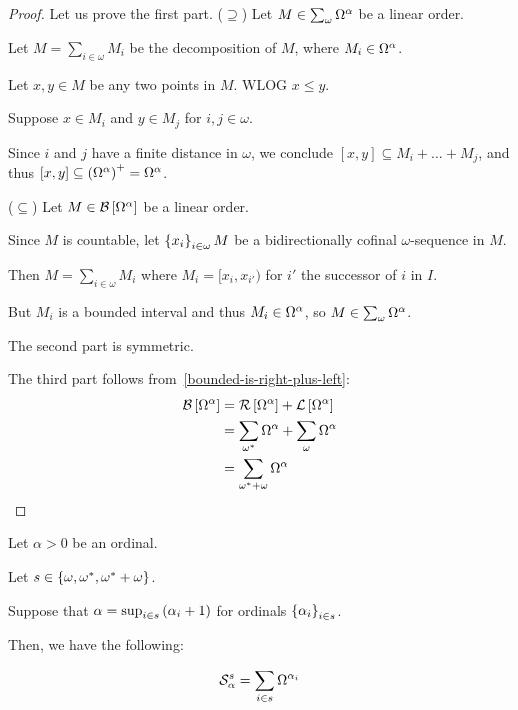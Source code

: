 \begin{proof}
  Let us prove the first part.
  ($\supseteq$) Let $M \in \sum_{\omega}{\Omega^{\alpha}}$ be a linear order.

  Let $M = \sum_{i \in \omega} M_i$ be the decomposition of $M$,
  where $M_i \in \Omega^{\alpha}$.

  Let $x, y \in M$ be any two points in $M$. WLOG $x \le y$.

  Suppose $x \in M_i$ and $y \in M_j$ for $i, j \in \omega$.

  Since $i$ and $j$ have a finite distance in $\omega$,
  we conclude $[x, y] \subseteq M_i + \ldots + M_j$,
  and thus $[x, y] \subseteq \left( {\Omega^{\alpha}} \right)^+ = \Omega^{{\alpha}}$.

  ($\subseteq$) Let $M \in \mathcal{B} \left[ {{\Omega^{\alpha}}} \right]$ be a linear order.

  Since $M$ is countable, let $\left\{ {x_i} \right\}_{i \in \omega} M$ be a bidirectionally cofinal
  $\omega$-sequence in $M$.

  Then $M = \sum_{i \in \omega} M_i$ where $M_i = [x_i, x_{i'})$ for $i'$
  the successor of $i$ in $I$.

  But $M_i$ is a bounded interval and thus $M_i \in \Omega^{\alpha}$, so $M \in \sum_{\omega}{\Omega^{\alpha}}$.

  The second part is symmetric.

  The third part follows from~\cref{bounded-is-right-plus-left}:
  \[
    \begin{aligned}
      \mathcal{B} \left[ {{\Omega^{\alpha}}} \right]
       & = \mathcal{R} \left[ {{\Omega^{\alpha}}} \right] + \mathcal{L} \left[ {{\Omega^{\alpha}}} \right]                     \\
       & = \sum_{\omega^\ast}{\Omega^{\alpha}} + \sum_{\omega}{\Omega^{\alpha}} \\
       & = \sum_{\omega^\ast + \omega}{\Omega^{\alpha}}
    \end{aligned}
  \]
\end{proof}

\begin{lemma}\label{b_alpha-structure-lemma}
  Let $\alpha > 0$ be an ordinal.

  Let $s \in \left\{ {\omega, \omega^\ast, \omega^\ast + \omega} \right\}$.

  Suppose that
  $\alpha = \sup_{i \in s} \left( {\alpha_i + 1} \right)$ for
  ordinals $\left\{ {\alpha_i} \right\}_{i \in s}$.

  Then, we have the following:

  \[
    \mathcal{S}^{s}_{\alpha} = \sum_{i \in s}{\Omega^{\alpha_i}}
  \]
\end{lemma}

